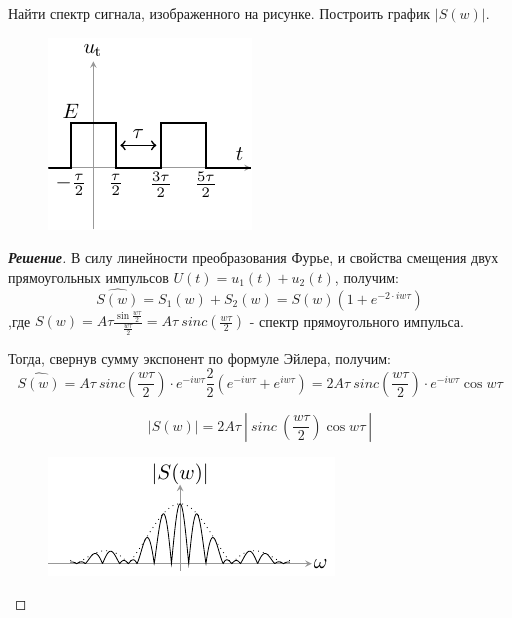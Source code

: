 \begin{task}
	Найти спектр сигнала, изображенного на рисунке. Построить график $|S(w)|$.
\end{task}
\begin{figure}[h!]
	\centering
	\includegraphics[width = .4\linewidth]{ris/task9_input.pdf}
	\caption{}
	\label{fig:9}
\end{figure}

\begin{proof}[\rm{\textbf{Решение}}]
	В силу линейности преобразования Фурье, и свойства смещения двух прямоугольных импульсов $ U(t) = u_1(t)+u_2(t)$,
	получим:
	$$ \widehat{S(w)} = S_1(w) +S_2(w) = S(w)(1+e^{-2\cdot iw\tau}) $$
	,где $ S(w) = A\tau\frac{\sin{\frac{w\tau}{2}}}{\frac{w\tau}{2}} = A\tau ~ sinc(\frac{w\tau}{2}) $ - спектр прямоугольного импульса.
	
	Тогда, свернув сумму экспонент по формуле Эйлера, получим:
	$$ \widehat{S(w)} = A\tau~sinc(\frac{w\tau}{2}) \cdot e^{-iw\tau}\frac22(e^{-iw\tau}+e^{iw\tau}) =
	2A\tau~sinc(\frac{w\tau}{2}) \cdot e^{-iw\tau} \cos{w\tau} $$

	$$ |S(w)| = 2A\tau~ |~sinc~(\frac{w\tau}{2})  \cos{w\tau}~|  $$
	\begin{figure}[h!]
		\centering
		\includegraphics[width = .6\linewidth]{ris/task9_out.pdf}
		\caption{}
		\label{fig:9.1}
	\end{figure}

\end{proof}